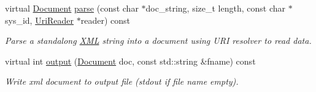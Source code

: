 \begin{DoxyCompactItemize}
virtual \hyperlink{class_d_d4hep_1_1_x_m_l_1_1_document}{Document} \hyperlink{class_d_d4hep_1_1_x_m_l_1_1_document_handler_a39f419422678d5dedace298e6b964b49}{parse} (const char $\ast$doc\_\-string, size\_\-t length, const char $\ast$sys\_\-id, \hyperlink{class_d_d4hep_1_1_x_m_l_1_1_uri_reader}{UriReader} $\ast$reader) const 
\begin{DoxyCompactList}\small\item\em Parse a standalong \hyperlink{namespace_d_d4hep_1_1_x_m_l}{XML} string into a document using URI resolver to read data. \item\end{DoxyCompactList}\item 
virtual int \hyperlink{class_d_d4hep_1_1_x_m_l_1_1_document_handler_aa107a6939a97904b84309abacef28c8c}{output} (\hyperlink{class_d_d4hep_1_1_x_m_l_1_1_document}{Document} doc, const std::string \&fname) const 
\begin{DoxyCompactList}\small\item\em Write xml document to output file (stdout if file name empty). \item\end{DoxyCompactList}\end{DoxyCompactItemize}
